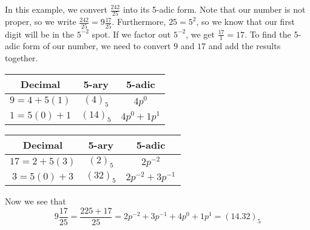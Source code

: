 \documentclass[a4paper]{article}
\begin{document}
\begin{example}
In this example, we convert $\frac{242}{25}$ into its 5-adic form.  
Note that our number is not proper, so we write 
$\frac{242}{25}=9\frac{17}{25}$.  Furthermore, $25=5^2$, so we know that
our first digit will be in the $5^{-2}$ spot.  If we factor out
$5^{-2}$, we get $\frac{17}{1}=17$.  To find the 5-adic form of our
number, we need to convert $9$ and $17$ and add the results together.
\begin{center}
  \begin{tabular}{|c|c|c|}
    \hline
      Decimal & 5-ary & 5-adic\\
    \hline
      $9=4+5(1)$ & $(4)_5$ & $4p^0$\\
      $1=5(0)+1$ & $(14)_5$ & $4p^0+1p^1$\\
    \hline
  \end{tabular}
  \qquad
  \begin{tabular}{|c|c|c|}
    \hline
      Decimal & 5-ary & 5-adic\\
    \hline
      $17=2+5(3)$ & $(2)_5$ & $2p^{-2}$\\
      $3=5(0)+3$ & $(32)_5$ & $2p^{-2}+3p^{-1}$\\
    \hline
  \end{tabular}
\end{center}
Now we see that 
\[
  9\frac{17}{25}=\frac{225+17}{25}=2p^{-2}+3p^{-1}+4p^0+1p^1=(14.32)_5
\]  
\end{example}
\end{document}
